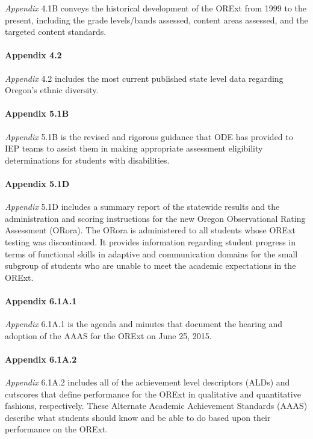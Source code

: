 \documentclass[]{article}
\let\oldparagraph\paragraph
\renewcommand{\paragraph}[1]{\oldparagraph{#1}\mbox{}}
\begin{document}
\emph{Appendix} 4.1B conveys the historical development of the ORExt
from 1999 to the present, including the grade levels/bands assessed,
content areas assessed, and the targeted content standards.

\paragraph{Appendix 4.2}\label{appendix-4.2}

\emph{Appendix} 4.2 includes the most current published state level data
regarding Oregon's ethnic diversity.

\paragraph{Appendix 5.1B}\label{appendix-5.1b}

\emph{Appendix} 5.1B is the revised and rigorous guidance that ODE has
provided to IEP teams to assist them in making appropriate assessment
eligibility determinations for students with disabilities.

\paragraph{Appendix 5.1D}\label{appendix-5.1d}

\emph{Appendix} 5.1D includes a summary report of the statewide results
and the administration and scoring instructions for the new Oregon
Observational Rating Assessment (ORora). The ORora is administered to
all students whose ORExt testing was discontinued. It provides
information regarding student progress in terms of functional skills in
adaptive and communication domains for the small subgroup of students
who are unable to meet the academic expectations in the ORExt.

\paragraph{Appendix 6.1A.1}\label{appendix-6.1a.1}

\emph{Appendix} 6.1A.1 is the agenda and minutes that document the
hearing and adoption of the AAAS for the ORExt on June 25, 2015.

\paragraph{Appendix 6.1A.2}\label{appendix-6.1a.2}

\emph{Appendix} 6.1A.2 includes all of the achievement level descriptors
(ALDs) and cutscores that define performance for the ORExt in
qualitative and quantitative fashions, respectively. These Alternate
Academic Achievement Standards (AAAS) describe what students should know
and be able to do based upon their performance on the ORExt.
\end{document}
